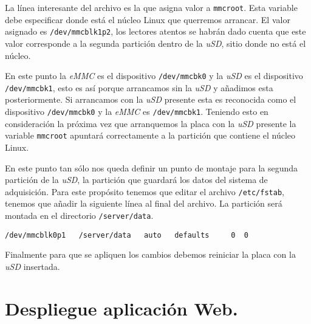 		La línea interesante del archivo es la que asigna valor a \texttt{mmcroot}. Esta variable debe especificar donde está el núcleo Linux
		que querremos arrancar. El valor asignado es \texttt{/dev/mmcblk1p2}, los lectores atentos se habrán dado cuenta que este valor
		corresponde a la segunda partición dentro de la \emph{uSD}, sitio donde no está el núcleo.
		\par 
		En este punto la \emph{eMMC} es el dispositivo \texttt{/dev/mmcbk0} y la \emph{uSD} es el dispositivo \texttt{/dev/mmcbk1}, esto es así porque
		arrancamos sin la \emph{uSD} y añadimos esta posteriormente. Si arrancamos con la \emph{uSD} presente esta es reconocida como el dispositivo
		\texttt{/dev/mmcbk0} y la \emph{eMMC} es \texttt{/dev/mmcbk1}. Teniendo esto en consideración la próxima vez que arranquemos la placa con la
		\emph{uSD} presente la variable \texttt{mmcroot} apuntará correctamente a la partición que contiene el núcleo Linux.
		\par
		En este punto tan sólo nos queda definir un punto de montaje para la segunda partición de la \emph{uSD}, la partición que guardará los datos
		del sistema de adquisición. Para este propósito tenemos que editar el archivo \texttt{/etc/fstab}, tenemos que añadir la siguiente
		línea al final del archivo. La partición será montada en el directorio \texttt{/server/data}.
		\begin{lstlisting}[style=myFile]
/dev/mmcblk0p1   /server/data   auto   defaults     0  0
		\end{lstlisting}
		Finalmente para que se apliquen los cambios debemos reiniciar la placa con la \emph{uSD} insertada.


\chapter{Despliegue aplicación Web.}
